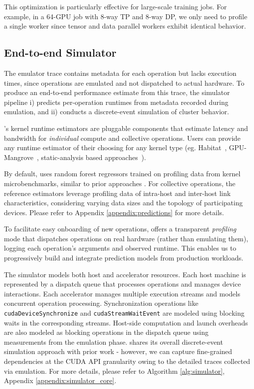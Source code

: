 This optimization is particularly effective for large-scale training jobs. For example, in a 64-GPU job with 8-way TP and 8-way DP, we only need to profile a single worker since tensor and data parallel workers exhibit identical behavior.


\subsection{End-to-end Simulator}

The emulator trace contains metadata for each operation but lacks execution times, since operations are emulated and not dispatched to actual hardware. To produce an end-to-end performance estimate from this trace, the simulator pipeline i) predicts per-operation runtimes from metadata recorded during emulation, and ii) conducts a discrete-event simulation of cluster behavior.

 \sysname’s kernel runtime estimators are pluggable components that estimate latency and bandwidth for \textit{individual} compute and collective operations. Users can provide any runtime estimator of their choosing for any kernel type (eg. Habitat~\cite{geoffrey2021habitat}, GPU-Mangrove~\cite{braun2020mangrove}, static-analysis based approaches~\cite{alavani2018predstatic}).

By default, \sysname uses random forest regressors trained on profiling data from kernel microbenchmarks, similar to prior approaches \cite{zhu2020daydream, vidur}. For collective operations, the reference estimators leverage profiling data of intra-host and inter-host link characteristics, considering varying data sizes and the topology of participating devices. Please refer to Appendix \ref{appendix:predictions} for more details.

To facilitate easy onboarding of new operations, \sysname offers a transparent \textit{profiling} mode that dispatches operations on real hardware (rather than emulating them), logging each operation’s arguments and observed runtime. This enables us to progressively build and integrate prediction models from production workloads.


 The simulator models both host and accelerator resources. Each host machine is represented by a dispatch queue that processes operations and manages device interactions. Each accelerator manages multiple execution streams and models concurrent operation processing. Synchronization operations like \texttt{cudaDeviceSynchronize} and \texttt{cudaStreamWaitEvent} are modeled using blocking waits in the corresponding streams. Host-side computation and launch overheads are also modeled as blocking operations in the dispatch queue using measurements from the emulation phase. \sysname shares its overall discrete-event simulation approach with prior work \cite{zhu2020daydream, santhanam2021distir} - however, we can capture fine-grained dependencies at the CUDA API granularity owing to the detailed traces collected via emulation. For more details, please refer to Algorithm \ref{alg:simulator}, Appendix \ref{appendix:simulator_core}.

